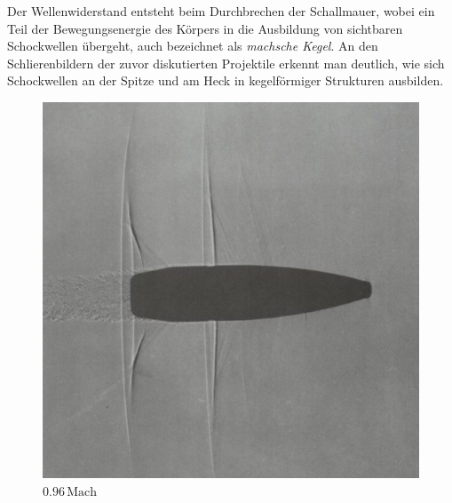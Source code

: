 Der Wellenwiderstand entsteht beim Durchbrechen 
der Schallmauer, wobei ein Teil der Bewegungsenergie 
des Körpers in die Ausbildung von sichtbaren Schockwellen übergeht,
auch bezeichnet als \emph{machsche Kegel}.
%
%
An den Schlierenbildern der zuvor diskutierten Projektile 
%
erkennt man deutlich,
wie sich Schockwellen an der Spitze und am Heck 
in kegelförmiger Strukturen ausbilden.
\begin{figure}
    \centering
    \begin{minipage}[b]{0.32\textwidth}
        \centering
        \includegraphics[width=\linewidth]{papers/ueberschall/figures/0.96_mach_projektil.jpg}
        \caption*{$0.96\,\mathrm{Mach}$}
    \end{minipage}
    \hfill
    \begin{minipage}[b]{0.32\textwidth}
        \centering

\end{minipage}
\end{figure}
